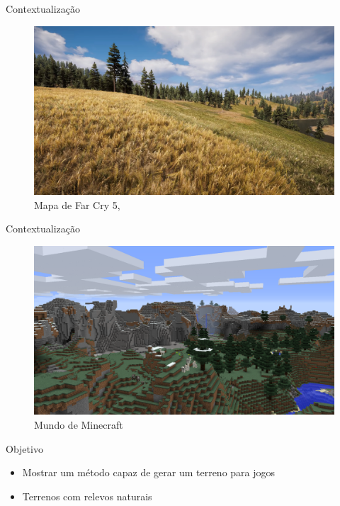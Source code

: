 \begin{frame}{Contextualização}
  \begin{figure}
		\centering
        \includegraphics[width=.8\textwidth]{img/intro/fc5terrain.png}
        \caption{Mapa de \alert{Far Cry 5}, \cite{Carrier2018farcry5}}
  \end{figure}
\end{frame}

\begin{frame}{Contextualização}
  \begin{figure}
		\centering
        \includegraphics[width=.8\textwidth]{img/intro/mineExtremeHills.png}
        \caption{Mundo de \alert{Minecraft}}
  \end{figure}
\end{frame}

\begin{frame}{Objetivo}
    \begin{itemize}
          \item Mostrar um método capaz de gerar um terreno para jogos
          \item Terrenos com relevos \alert{naturais}
      \end{itemize}
\end{frame}